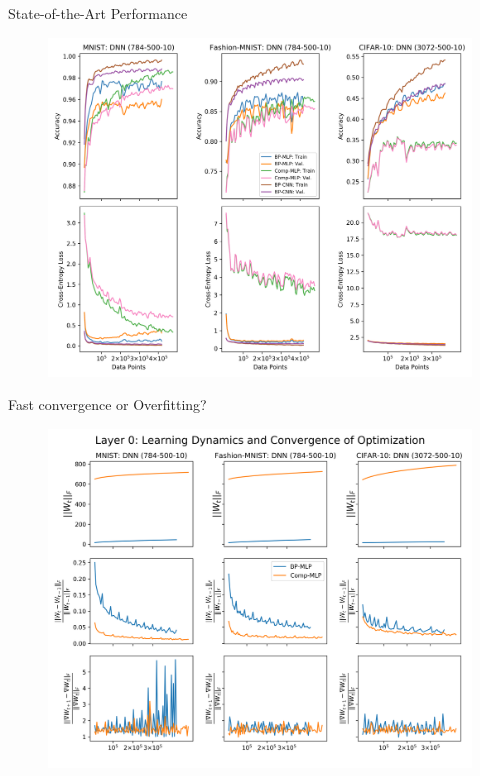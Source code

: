 \documentclass[dvipsnames, usenames]{beamer}
\begin{document}

\begin{frame}{State-of-the-Art Performance}
	\begin{figure}
		\centering
		\includegraphics[width=\textwidth]{../figures/learning}
	\end{figure}
\end{frame}


\begin{frame}{Fast convergence or Overfitting?}
	\begin{figure}
		\centering
		\includegraphics[width=\textwidth]{../figures/dynamics_l0}
	\end{figure}
\end{frame}
\end{document}
